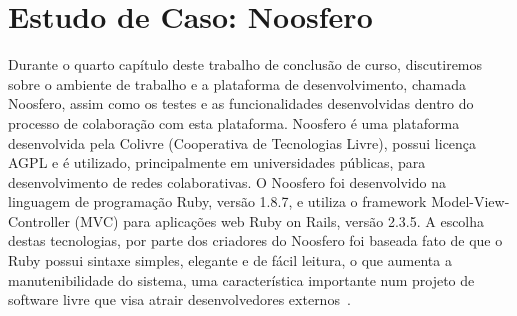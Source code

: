 \chapter{Estudo de Caso: Noosfero}
\label{noosfero}
Durante o quarto capítulo deste trabalho de conclusão de curso, discutiremos sobre 
o ambiente de trabalho e a plataforma de desenvolvimento, chamada Noosfero, assim 
como os testes e as funcionalidades desenvolvidas dentro do processo de colaboração 
com esta plataforma.
%
Noosfero é uma plataforma desenvolvida pela Colivre (Cooperativa de Tecnologias
Livre), possui licença AGPL e é utilizado, principalmente em universidades públicas,
para desenvolvimento de redes colaborativas.
%
O Noosfero foi desenvolvido na linguagem de programação Ruby, versão 1.8.7, e utiliza
o framework Model-View-Controller (MVC) para aplicações web Ruby on Rails, versão 
2.3.5. A escolha destas tecnologias, por parte dos criadores do Noosfero foi baseada 
fato de que o Ruby possui sintaxe simples, elegante e de fácil leitura, o que aumenta
a manutenibilidade do sistema, uma característica importante num projeto de software
livre que visa atrair desenvolvedores externos~\cite{meirelles2013}.

